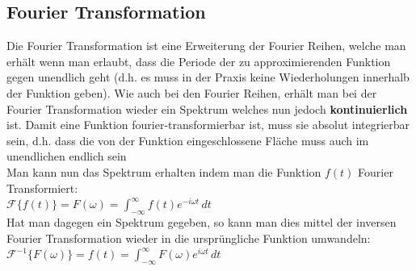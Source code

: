 \documentclass[12pt,a4paper]{article}
\newcommand{\nl}{\\[0.1cm]}
\begin{document}
\subsection{Fourier Transformation}
Die Fourier Transformation ist eine Erweiterung der Fourier Reihen, welche man erhält wenn man erlaubt, dass die Periode der zu approximierenden Funktion gegen unendlich geht (d.h. es muss in der Praxis keine Wiederholungen innerhalb der Funktion geben). Wie auch bei den Fourier Reihen, erhält man bei der Fourier Transformation wieder ein Spektrum welches nun jedoch \textbf{kontinuierlich} ist.
Damit eine Funktion fourier-transformierbar ist, muss sie absolut integrierbar sein, d.h. dass die von der Funktion eingeschlossene Fläche muss auch im unendlichen endlich sein\nl
Man kann nun das Spektrum erhalten indem man die Funktion $f(t)$ Fourier Transformiert:\nl
$\displaystyle \mathcal{F}\{f(t)\} = F(\omega) = \int_{-\infty}^\infty f(t)e^{-i\omega t}\,dt$\nl
Hat man dagegen ein Spektrum gegeben, so kann man dies mittel der inversen Fourier Transformation wieder in die ursprüngliche Funktion umwandeln:\nl
$\displaystyle \mathcal{F}^{-1}\{F(\omega)\} = f(t) = \int_{-\infty}^\infty F(\omega) e^{i\omega t}\,dt$\nl
\end{document}
